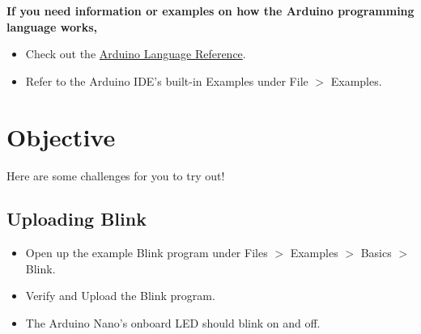 \documentclass{article}
\begin{document}
{\bf If you need information or examples on how the Arduino programming language works,}
\begin{itemize}
    \item Check out the \href{https://www.arduino.cc/reference/en/}{Arduino Language Reference}.
    \item Refer to the Arduino IDE's built-in Examples under File $>$ Examples. 
\end{itemize}

\clearpage

\section{Objective}

Here are some challenges for you to try out!

\subsection{Uploading Blink}

\begin{itemize}
    \item Open up the example Blink program under Files $>$ Examples $>$ Basics $>$ Blink.
    \item Verify and Upload the Blink program.
    \item The Arduino Nano's onboard LED should blink on and off.
\end{itemize}
\end{document}
